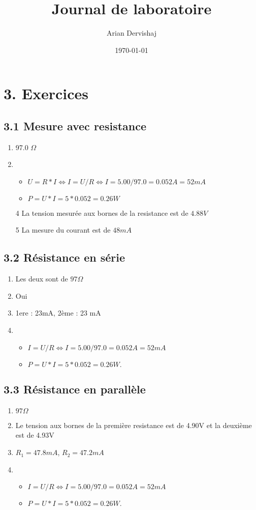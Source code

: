 \documentclass[a4paper, 12pt]{article}
\title{Journal de laboratoire}
\author{Arian Dervishaj}
\date{\today}
\begin{document}
\maketitle
\pagebreak

\section*{3. Exercices}
\subsection*{3.1 Mesure avec resistance}
\begin{enumerate}
    \item 97.0 $\Omega$
    \item \begin{itemize}
        \item $U = R*I \Longleftrightarrow I = U/R \Longleftrightarrow I = 5.00 / 97.0 = 0.052 A = 52 mA $
        \item $P = U * I = 5 * 0.052 = 0.26W$
        \end{itemize} 
    \item[4] La tension mesurée aux bornes de la resistance est de $4.88V$
    \item[5] La mesure du courant est de $48 mA$
\end{enumerate}

\subsection*{3.2 Résistance en série}
\begin{enumerate}
    \item Les deux sont de $97 \Omega$
    \item Oui
    \item 1ere : 23mA, 2ème : 23 mA
    \item \begin{itemize}
        \item $I = U/R \Longleftrightarrow I = 5.00 / 97.0 = 0.052 A = 52 mA $
        \item $P = U * I = 5 * 0.052 = 0.26W.$
        \end{itemize} 
\end{enumerate}

\subsection*{3.3 Résistance en parallèle}
\begin{enumerate}
    \item $97 \Omega$
    \item Le tension aux bornes de la première resistance est de 4.90V et la deuxième est de 4.93V
    \item $R_1 = 47.8mA$, $R_2 = 47.2mA$
    \item 
        \begin{itemize}
            \item $I = U/R \Longleftrightarrow I = 5.00 / 97.0 = 0.052 A = 52 mA$
            \item $P = U * I = 5 * 0.052 = 0.26W.$
        \end{itemize}
\end{enumerate}
\end{document}
